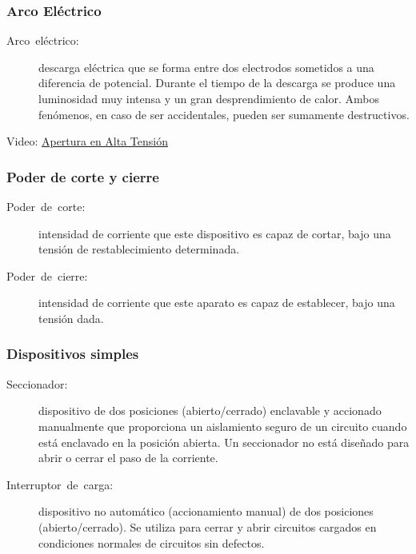 \documentclass[serif, xcolor=dvipsnames]{beamer}
\begin{document}
\begin{frame}
  \frametitle{Arco Eléctrico}
  \begin{description}
  \item [{Arco~eléctrico:}] descarga eléctrica que se forma entre dos
    electrodos sometidos a una diferencia de potencial. Durante el
    tiempo de la descarga se produce una luminosidad muy intensa y un
    gran desprendimiento de calor. Ambos fenómenos, en caso de ser
    accidentales, pueden ser sumamente destructivos.\end{description}
  \begin{block} {}
    \centering Video:
    \href{http://www.youtube.com/watch?v=WBTvGqRA4_0}{Apertura en Alta
      Tensión}
  \end{block}

\end{frame}
\begin{frame}
  \frametitle{Poder de corte y cierre}
  \begin{description}
  \item [{Poder~de~corte:}] intensidad de corriente que este
    dispositivo es capaz de cortar, bajo una tensión de
    restablecimiento determinada.
  \item [{Poder~de~cierre:}] intensidad de corriente que este aparato
    es capaz de establecer, bajo una tensión dada.
  \end{description}

\end{frame}
\begin{frame}
  \frametitle{Dispositivos simples}
  \begin{description}
  \item [{Seccionador:}] dispositivo de dos posiciones
    (abierto/cerrado) enclavable y accionado manualmente que
    proporciona un aislamiento seguro de un circuito cuando está
    enclavado en la posición abierta.  Un seccionador no está diseñado
    para abrir o cerrar el paso de la corriente.
  \item [{Interruptor~de~carga:}] dispositivo no automático
    (accionamiento manual) de dos posiciones (abierto/cerrado). Se
    utiliza para cerrar y abrir circuitos cargados en condiciones
    normales de circuitos sin defectos.
  \end{description}

\end{frame}
\end{document}
